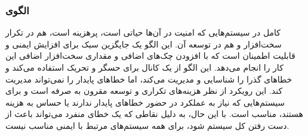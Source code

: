 \subsubsection{الگوی }
\label{archSafeProtectSingleChSec}
\begin{RTL}
 کامل در سیستم‌هایی که امنیت در آن‌ها حیاتی است،
پرهزینه است، هم در تکرار سخت‌افزار و هم در توسعه آن.
این الگو یک جایگزین سبک برای افزایش ایمنی و قابلیت اطمینان است که با افزودن
چک‌های اضافی و مقداری سخت‌افزار اضافی این کار را انجام می‌دهد.
این الگو از یک کانال برای حسگر و تحریک استفاده می‌کند و خطاهای گذرا را
شناسایی و مدیریت می‌کند، اما خطاهای پایدار را نمی‌تواند مدیریت کند.
این رویکرد از نظر هزینه‌های تکراری و توسعه مقرون به صرفه است و برای سیستم‌هایی
که نیاز به عملکرد در حضور خطاهای پایدار ندارند یا حساس به هزینه هستند،
مناسب است. با این حال، به دلیل نقاطی که یک خطای منفرد می‌تواند باعث
از دست رفتن کل سیستم شود، برای همه سیستم‌های مرتبط با ایمنی مناسب نیست.
\end{RTL}